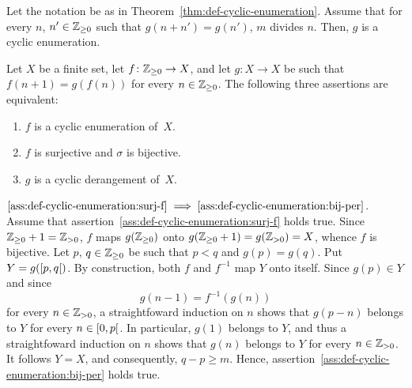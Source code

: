 \begin{theorem}
  Let the notation be as in Theorem~\ref{thm:def-cyclic-enumeration}.
  Assume that for every $n$, $n' \in \mathbb{Z}_{\ge 0}$ such that $g(n + n') = g(n')$, $m$ divides $n$.
  Then, $g$ is a cyclic enumeration.
\end{theorem}

\begin{theorem}
  Let $X$ be a finite set,
  let $f\colon \mathbb{Z}_{\ge 0} \to X$, and
  let $g\colon X \to X$ be such that
  $f(n + 1) = g(f(n))$ for every $n \in \mathbb{Z}_{\ge 0}$.
  The following three assertions are equivalent:
  \begin{enumerate}
  \item $f$ is a cyclic enumeration of~$X$.
  \item $f$ is surjective and $\sigma$ is bijective.
  \item $g$ is a cyclic derangement of~$X$.
  \end{enumerate} 
\end{theorem}

  $\ref{ass:def-cyclic-enumeration:surj-f} \implies  \ref{ass:def-cyclic-enumeration:bij-per}$.
  Assume that assertion~\ref{ass:def-cyclic-enumeration:surj-f} holds true.
  Since $\mathbb{Z}_{\ge 0} + 1 = \mathbb{Z}_{> 0}$,
  $f$ maps $g(\mathbb{Z}_{\ge 0})$ onto $g(\mathbb{Z}_{\ge 0} + 1) = g(\mathbb{Z}_{> 0}) = X$,
  whence $f$ is bijective.
  Let $p$, $q \in \mathbb{Z}_{\ge 0}$ be such that $p < q$ and $g(p) = g(q)$.
  Put $Y = g(\left[ p, q \right[)$.
  By construction, both $f$ and $f^{-1}$ map $Y$ onto itself.
  Since $g(p) \in Y$ and since
  $$g(n - 1) = f^{-1}(g(n))$$
  for every $n \in \mathbb{Z}_{> 0}$,
  a straightfoward induction on $n$ shows that 
  $g(p - n)$ belongs to $Y$ for every $n \in \left[ 0, p \right[$.
  In particular, $g(1)$ belongs to $Y$, and thus 
  a straightfoward induction on $n$ shows that
  $g(n)$ belongs to $Y$ for every $n \in \mathbb{Z}_{> 0}$.
  It follows $Y = X$, and consequently, $q - p \ge m$.
  Hence, assertion~\ref{ass:def-cyclic-enumeration:bij-per} holds true.